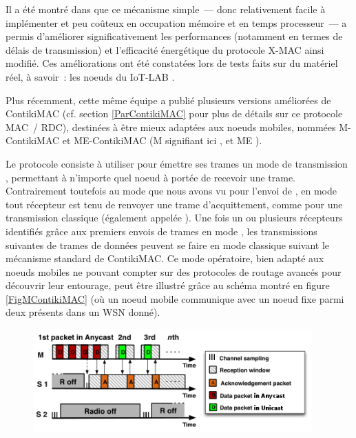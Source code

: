 Il a été montré dans \cite{T-AAD} que ce mécanisme simple~--- donc
relativement facile à implémenter et peu coûteux en occupation mémoire
et en temps processeur~--- a permis d'améliorer significativement les 
performances (notamment en termes de délais de transmission) et
l'efficacité énergétique du protocole X-MAC ainsi modifié. Ces améliorations
ont été constatées lors de tests faits sur du matériel réel, à savoir~:
les noeuds du  IoT-LAB \cite{IotLAB}.

\bigskip

Plus récemment, cette même équipe a publié plusieurs versions améliorées
de ContikiMAC (cf. section \ref{ParContikiMAC} pour plus de détails sur
ce protocole MAC~/ RDC), destinées à être mieux adaptées aux noeuds mobiles,
nommées M-ContikiMAC et ME-ContikiMAC \cite{ME-ContikiMAC} (M signifiant ici
, et ME ).

Le protocole  consiste à utiliser pour émettre ses trames
un mode de transmission , permettant à n'importe quel
noeud à portée de recevoir une trame. Contrairement toutefois au mode
 que nous avons vu pour l'envoi de ,
en mode  tout récepteur est tenu de renvoyer une trame
d'acquittement, comme pour une transmission classique (également appelée
). Une fois un ou plusieurs récepteurs identifiés grâce
aux premiers envois de trames en mode , les transmissions
suivantes de trames de données peuvent se faire en mode 
classique suivant le mécanisme standard de ContikiMAC. Ce mode opératoire,
bien adapté aux noeuds mobiles ne pouvant compter sur des protocoles de
routage avancés pour découvrir leur entourage, peut être illustré grâce
au schéma montré en figure \vref{FigMContikiMAC} (où un noeud mobile
communique avec un noeud fixe parmi deux présents dans un WSN donné).

\begin{figure}[!htb]
\centering
\includegraphics[width=10.75cm]{images/ch3-m-contikimac.png}
\label{FigMContikiMAC}
\end{figure}

